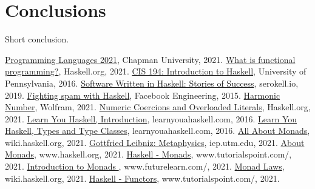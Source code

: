 \documentclass{article}
\begin{document}
\section{Conclusions}\label{conclusions}
Short conclusion. 

\begin{thebibliography}{99}
 \href{https://github.com/alexhkurz/programming-languages-2021/blob/main/README.md}{Programming Languages 2021}, Chapman University, 2021.
 \href{https://wiki.haskell.org/Introduction#What_is_functional_programming.3F}{What is functional programming?}, Haskell.org, 2021.
 \href{https://www.cis.upenn.edu/~cis194/fall16/}{CIS 194: Introduction to Haskell}, University of Pennsylvania, 2016.
 \href{https://serokell.io/blog/top-software-written-in-haskell}{Software Written in Haskell: Stories of Success}, serokell.io, 2019.
 \href{https://engineering.fb.com/2015/06/26/security/fighting-spam-with-haskell/}{Fighting spam with Haskell}, Facebook Engineering, 2015.
 \href{https://mathworld.wolfram.com/HarmonicNumber.html}{Harmonic Number}, Wolfram, 2021.
 \href{https://www.haskell.org/tutorial/numbers.html}{Numeric Coercions and Overloaded Literals}, Haskell.org, 2021.
 \href{http://learnyouahaskell.com/introduction}{Learn You Haskell, Introduction}, learnyouahaskell.com, 2016.
 \href{http://learnyouahaskell.com/types-and-typeclasses}{Learn You Haskell, Types and Type Classes}, learnyouahaskell.com, 2016.
 \href{https://wiki.haskell.org/All_About_Monads#Introduction}{All About Monads}, wiki.haskell.org, 2021.
 \href{https://iep.utm.edu/leib-met/}{Gottfried Leibniz: Metaphysics}, iep.utm.edu, 2021.
 \href{https://www.haskell.org/tutorial/monads.html}{About Monads}, www.haskell.org, 2021.
 \href{https://www.tutorialspoint.com/haskell/haskell_monads.htm}{Haskell - Monads}, www.tutorialspoint.com/, 2021.
 \href{https://www.futurelearn.com/info/courses/functional-programming-haskell/0/steps/27246}{Introduction to Monads
}, www.futurelearn.com/, 2021.
 \href{https://wiki.haskell.org/Monad_laws}{Monad Laws}, wiki.haskell.org, 2021.
 \href{https://www.tutorialspoint.com/haskell/haskell_functor.htm}{Haskell - Functors}, www.tutorialspoint.com/, 2021.

\end{thebibliography}
\end{document}

